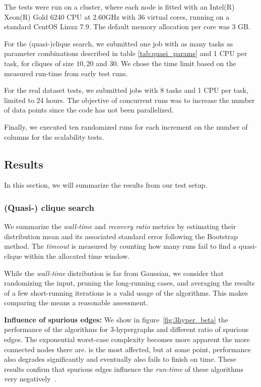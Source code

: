 The tests were run on a cluster, where each node
is fitted with an Intel(R) Xeon(R) Gold 6240 CPU at 2.60GHz with 36 virtual cores,
running on a standard CentOS Linux 7.9. The default memory allocation per core was
3 GB. 

For the (quasi-)clique search, we submitted one job with as many tasks as
parameter combinations described in table \ref{tab:quasi_params} and 1 CPU per task,
for cliques of size $10, 20$ and $30$.  We chose the time limit based on the measured
run-time from early test runs.

For the real dataset tests, we submitted jobs with 8 tasks and 1 CPU per task,
limited to 24 hours. The objective of concurrent runs was to increase the number
of data points since the code has not been parallelized.

Finally, we executed ten randomized runs for each increment on the number of columns for the scalability tests.

\subsection{Results}
\label{sec:results}

In this section, we will summarize the results from our test setup.

\subsubsection{(Quasi-) clique search}
\label{sec:result_quasi_search}

We summarize the \emph{wall-time} and \emph{recovery ratio} metrics by estimating
their distribution mean and its associated standard error following the Bootstrap method.
The \emph{timeout} is measured by counting how many runs fail to find a quasi-clique within
the allocated time window.

While the \emph{wall-time} distribution is far from Gaussian, we consider that randomizing the
input, pruning the long-running cases, and averaging the results of a few short-running
iterations is a valid usage of the algorithms. This makes comparing the means a reasonable
assessment.

\textbf{Influence of spurious edges:}
We show in figure~\ref{fig:3hyper_beta} the performance of the algorithms for $3$-hypergraphs
and different ratio of spurious edges. The exponential worst-case
complexity becomes more apparent the more connected nodes there are.
\Find is the most affected, but at some point, \PresQ performance also degrades significantly and eventually also fails to finish on time.
These results confirm that spurious edges influence the
\emph{run-time} of these algorithms very negatively~\cite{koeller2006heuristic}.


